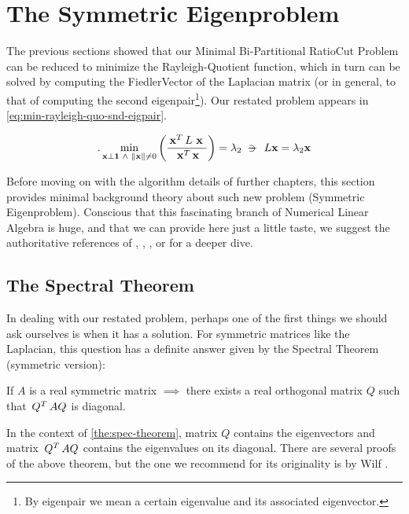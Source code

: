 \section{The Symmetric Eigenproblem}

The previous sections showed that our Minimal Bi-Partitional RatioCut
Problem can be reduced to minimize the Rayleigh-Quotient function,
which in turn can be solved by computing the \gls{FiedlerVector} of the
\gls{Laplacian} matrix (or in general, to that of computing the second
eigenpair\footnote{By eigenpair we mean a certain eigenvalue and its
  associated eigenvector.}). Our restated problem appears in
\cref{eq:min-rayleigh-quo-snd-eigpair}.

\begin{equation}
  \label{eq:min-rayleigh-quo-snd-eigpair}.  
  \min\limits_{\vec{x} \bot \vec{1} \ds{\land} \norm{\vec{x}} \ne 0}
  \left(  
  \dfrac{\trans{\vec{x}} L \ds{\vec{x}}}{\trans{\vec{x}} \vec{x}}
  \right)
  = \lambda_2
  \suchthat{L\vec{x} = \lambda_2\vec{x}}  
\end{equation}
\joinbelow{1cm}

Before moving on with the algorithm
details of further chapters, this section provides minimal background
theory about such new problem (Symmetric Eigenproblem). Conscious
that this fascinating branch of 
Numerical Linear Algebra is huge, and that we can provide here just a
little taste, we suggest the authoritative references of
\cite{parlett80}, \cite{saad92}, \cite{cullum02}, \cite{demmel97} or
\cite{bai00} for a deeper dive. 

\subsection{The Spectral Theorem}

In dealing with our restated problem, perhaps one of the first things
we should ask ourselves is when it has a solution. For symmetric
matrices like the \gls{Laplacian}, this question has a definite answer given
by the Spectral Theorem (symmetric version):

\begin{theorem}
\label{the:spec-theorem}
If $A$ is a real symmetric matrix $\implies$ there exists a real orthogonal matrix $Q$ such that $\,{Q}^{T}\,AQ$ is diagonal. 
\end{theorem}
\joinbelow{1cm}

In the context of \cref{the:spec-theorem}, matrix $Q$ contains the
eigenvectors and matrix $\,{Q}^{T}\,AQ$ contains the eigenvalues on its
diagonal. There are several proofs of the above theorem, but the one we
recommend for its originality is by Wilf \cite{wilf81}.

